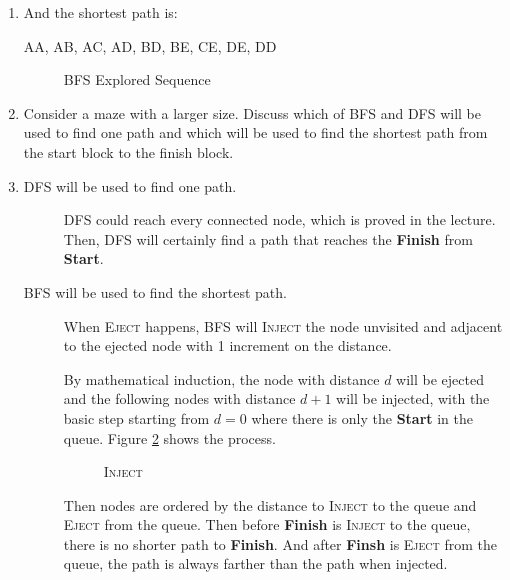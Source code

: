 \documentclass[12pt,a4paper]{article}
\makeatletter
\newtheorem*{solution}{Solution}
\theoremstyle{definition}
\renewenvironment{solution}[1][Solution] {\par\pushQED{\qed}\normalfont\topsep6\p@\@plus6\p@\relax\trivlist\item[\hskip\labelsep\bfseries#1\@addpunct{.}]\ignorespaces}{\popQED\endtrivlist\@endpefalse} \makeatother
\makeatother
\begin{document}
\begin{enumerate}
\begin{enumerate}
\begin{solution}
            And the shortest path is:
            \begin{tcolorbox}
                AA, AB, AC, AD, BD, BE, CE, DE, DD
            \end{tcolorbox}

            \begin{figure}[h]
                \centering
                
                \caption{BFS Explored Sequence}
                \label{fig:bfs}
            \end{figure}
        \end{solution}
        \item Consider a maze with a larger size. Discuss which of BFS and DFS will be used to find one path and which will be used to find the shortest path from the start block to the finish block.
        \begin{solution}
            \begin{description}
                \item[DFS will be used to find one path.] DFS could reach every connected node, which is proved in the lecture. Then, DFS will certainly find a path that reaches the \textbf{Finish} from \textbf{Start}.
                \item[BFS will be used to find the shortest path.] When \textsc{Eject} happens, BFS will \textsc{Inject} the node unvisited and adjacent to the ejected node with 1 increment on the distance. 
                
                By mathematical induction, the node with distance $d$ will be ejected and the following nodes with distance $d+1$ will be injected, with the basic step starting from $d=0$ where there is only the \textbf{Start} in the queue. Figure \ref{fig:bfsl} shows the process.

                \begin{figure}[h]
                    \centering
                    
                    \caption{\textsc{Inject}}
                    \label{fig:bfsl}
                \end{figure}
                
                Then nodes are ordered by the distance to \textsc{Inject} to the queue and \textsc{Eject} from the queue. Then before \textbf{Finish} is \textsc{Inject} to the queue, there is no shorter path to \textbf{Finish}. And after \textbf{Finsh} is \textsc{Eject} from the queue, the path is always farther than the path when injected.


\end{description}
\end{solution}
\end{enumerate}
\end{enumerate}
\end{document}
